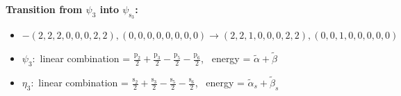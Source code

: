 \documentclass[12pt,a4paper]{article}
\begin{document}
        \noindent\textbf{Transition from $\psi_{3}$ into $\psi_{\text{s}_{3}}$:}
        \begin{itemize}
            \item $- (2, 2, 2, 0, 0, 0, 2, 2), (0, 0, 0, 0, 0, 0, 0, 0) \rightarrow (2, 2, 1, 0, 0, 0, 2, 2), (0, 0, 1, 0, 0, 0, 0, 0)$
        
            \item $\psi_{3}:$ linear combination = $\frac{\text{p}_{2}}{2} + \frac{\text{p}_{3}}{2} - \frac{\text{p}_{5}}{2} - \frac{\text{p}_{6}}{2}$, \
            energy = $\tilde{\alpha} + \tilde{\beta}$
            
            \item $\eta_{3}:$ linear combination = $\frac{\text{s}_{2}}{2} + \frac{\text{s}_{3}}{2} - \frac{\text{s}_{5}}{2} - \frac{\text{s}_{6}}{2}$, \
            energy = $\tilde{\alpha}_{s} + \tilde{\beta}_{s}$
            

\end{itemize}
\end{document}

